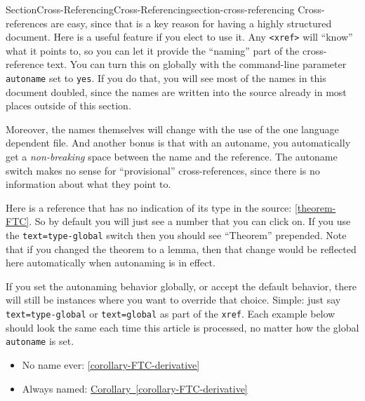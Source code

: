 \documentclass[twoside,10pt,]{article}
\newcommand{\xreffont}{\relax}
\newcommand{\mono}[1]{\texttt{#1}}
\numberwithin{equation}{section}
\begin{document}
%
%
\typeout{************************************************}
\typeout{************************************************}
%
\begin{sectionptx}{Section}{Cross-Referencing}{}{Cross-Referencing}{}{}{section-cross-referencing}
Cross-references are easy, since that is a key reason for having a highly structured document.  Here is a useful feature if you elect to use it.  Any \mono{<xref>} will ``know'' what it points to, so you can let it provide the ``naming'' part of the cross-reference text.  You can turn this on globally with the command-line parameter \mono{autoname} set to \mono{\textquotesingle{}yes\textquotesingle{}}.  If you do that, you will see most of the names in this document doubled, since the names are written into the source already in most places outside of this section.%
\par
Moreover, the names themselves will change with the use of the one language dependent file.  And another bonus is that with an autoname, you automatically get a \emph{non-breaking} space between the name and the reference.  The autoname switch makes no sense for ``provisional'' cross-references, since there is no information about what they point to.%
\par
Here is a reference that has no indication of its type in the source:  \hyperref[theorem-FTC]{{\xreffont\ref{theorem-FTC}}}.  So by default you will just see a number that you can click on.  If you use the \mono{text=\textquotedbl{}type-global\textquotedbl{}} switch then you should see ``Theorem'' prepended.  Note that if you changed the theorem to a lemma, then that change would be reflected here automatically when autonaming is in effect.%
\par
If you set the autonaming behavior globally, or accept the default behavior, there will still be instances where you want to override that choice.  Simple: just say \mono{text=\textquotedbl{}type-global\textquotedbl{}} or \mono{text=\textquotedbl{}global\textquotedbl{}} as part of the \mono{xref}.  Each example below should look the same each time this article is processed, no matter how the global \mono{autoname} is set.%
\begin{itemize}[label=\textbullet]
\item{}No name ever: \hyperref[corollary-FTC-derivative]{{\xreffont\ref{corollary-FTC-derivative}}}%
\item{}Always named: \hyperref[corollary-FTC-derivative]{Corollary~{\xreffont\ref{corollary-FTC-derivative}}}%

\end{itemize}
\end{sectionptx}
\end{document}
